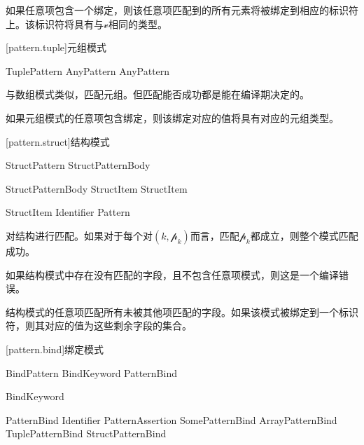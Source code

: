 \pnum
如果任意项包含一个绑定，则该任意项匹配到的所有元素将被绑定到相应的标识符上。该标识符将具有与$\mathcal{v}$相同的类型。

[pattern.tuple]{元组模式}

\begin{bnf}{TuplePattern}
    \terminal{(} AnyPattern \bnflp\terminal{,} AnyPattern\bnfrp\bnfs\ \terminal{)}
\end{bnf}

\pnum
与数组模式类似，匹配元组。但匹配能否成功都是能在编译期决定的。

\pnum
如果元组模式的任意项包含绑定，则该绑定对应的值将具有对应的元组类型。

[pattern.struct]{结构模式}

\begin{bnf}{StructPattern}
    \terminal{\{} StructPatternBody \terminal{\}}
\end{bnf}

\begin{bnf}{StructPatternBody}
    StructItem \bnflp\terminal{,} StructItem\bnfrp\bnfs
\end{bnf}

\begin{bnf}{StructItem}
    Identifier \terminal{:} Pattern
\end{bnf}

\pnum
{}对结构进行匹配。如果对于每个对$(k, \mathcal{p}_k)$而言，匹配$\mathcal{p}_k$都成立，则整个模式匹配成功。

\pnum
如果结构模式中存在没有匹配的字段，且不包含任意项模式，则这是一个编译错误。

\pnum
结构模式的任意项匹配所有未被其他项匹配的字段。如果该模式被绑定到一个标识符，则其对应的值为这些剩余字段的集合。

[pattern.bind]{绑定模式}

\begin{bnf}{BindPattern}
    BindKeyword PatternBind
\end{bnf}

\begin{bnf}{BindKeyword}
     \br
      \br
     
\end{bnf}

\begin{bnf}{PatternBind}
    Identifier PatternAssertion \br
    SomePatternBind \br
    ArrayPatternBind \br
    TuplePatternBind \br
    StructPatternBind
\end{bnf}

